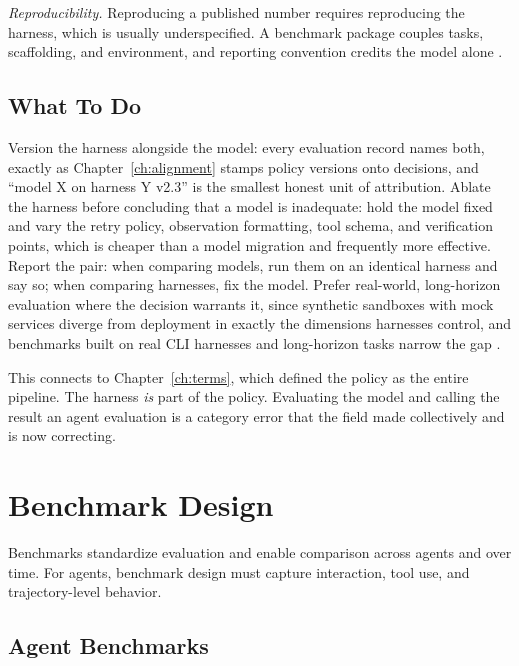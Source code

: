 \documentclass[11pt]{book}
\begin{document}
\textit{Reproducibility.} Reproducing a published number requires reproducing the harness, which is usually underspecified. A benchmark package couples tasks, scaffolding, and environment, and reporting convention credits the model alone \cite{uniace2026}.

\subsection{What To Do}

Version the harness alongside the model: every evaluation record names both, exactly as Chapter~\ref{ch:alignment} stamps policy versions onto decisions, and ``model X on harness Y v2.3'' is the smallest honest unit of attribution. Ablate the harness before concluding that a model is inadequate: hold the model fixed and vary the retry policy, observation formatting, tool schema, and verification points, which is cheaper than a model migration and frequently more effective. Report the pair: when comparing models, run them on an identical harness and say so; when comparing harnesses, fix the model. Prefer real-world, long-horizon evaluation where the decision warrants it, since synthetic sandboxes with mock services diverge from deployment in exactly the dimensions harnesses control, and benchmarks built on real CLI harnesses and long-horizon tasks narrow the gap \cite{wildclaw2026, clawswe2026}.

This connects to Chapter~\ref{ch:terms}, which defined the policy as the entire pipeline. The harness \textit{is} part of the policy. Evaluating the model and calling the result an agent evaluation is a category error that the field made collectively and is now correcting.

\section{Benchmark Design}

Benchmarks standardize evaluation and enable comparison across agents and over time. For agents, benchmark design must capture interaction, tool use, and trajectory-level behavior.

\subsection{Agent Benchmarks}
\end{document}
